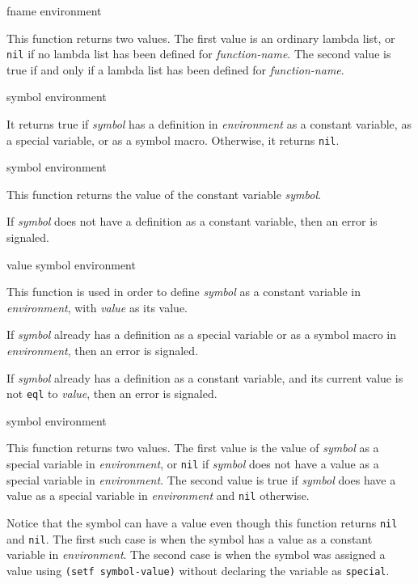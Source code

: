  {fname environment}

This function returns two values.  The first value is an ordinary
lambda list, or \texttt{nil} if no lambda list has been defined for
\textit{function-name}.  The second value is true if and only if a
lambda list has been defined for \textit{function-name}.

 {symbol environment}

It returns true if \textit{symbol} has a definition in
\textit{environment} as a constant variable, as a special variable, or
as a symbol macro.  Otherwise, it returns \texttt{nil}.

 {symbol environment}

This function returns the value of the constant variable
\textit{symbol}.

If \textit{symbol} does not have a definition as a constant variable,
then an error is signaled.

 {value symbol environment}

This function is used in order to define \textit{symbol} as a constant
variable in \textit{environment}, with \textit{value} as its value.

If \textit{symbol} already has a definition as a special variable or
as a symbol macro in \textit{environment}, then an error is signaled.

If \textit{symbol} already has a definition as a constant variable,
and its current value is not \texttt{eql} to \textit{value}, then an
error is signaled.

 {symbol environment}

This function returns two values.  The first value is the value of
\textit{symbol} as a special variable in \textit{environment}, or
\texttt{nil} if \textit{symbol} does not have a value as a special
variable in \textit{environment}.  The second value is true if
\textit{symbol} does have a value as a special variable in
\textit{environment} and \texttt{nil} otherwise.

Notice that the symbol can have a value even though this function
returns \texttt{nil} and \texttt{nil}.  The first such case is when
the symbol has a value as a constant variable in \textit{environment}.
The second case is when the symbol was assigned a value using
\texttt{(setf symbol-value)} without declaring the variable as
\texttt{special}.

